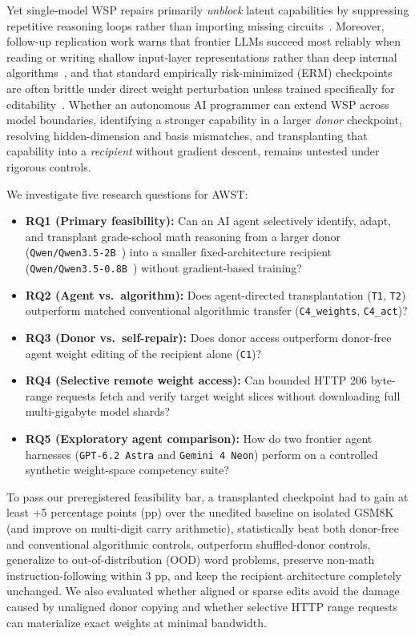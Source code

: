 \documentclass[11pt]{article}
\newcommand{\codepath}[1]{\texttt{\nolinkurl{#1}}}
\begin{document}
Yet single-model WSP repairs primarily \emph{unblock} latent capabilities by suppressing repetitive reasoning loops rather than importing missing circuits~\cite{takehi2026sparks}. Moreover, follow-up replication work warns that frontier LLMs succeed most reliably when reading or writing shallow input-layer representations rather than deep internal algorithms~\cite{goworek2026replicating}, and that standard empirically risk-minimized (ERM) checkpoints are often brittle under direct weight perturbation unless trained specifically for editability~\cite{ropinski2026editready}. Whether an autonomous AI programmer can extend WSP across model boundaries, identifying a stronger capability in a larger \emph{donor} checkpoint, resolving hidden-dimension and basis mismatches, and transplanting that capability into a \emph{recipient} without gradient descent, remains untested under rigorous controls.

We investigate five research questions for AWST:

\begin{itemize}
\item \textbf{RQ1 (Primary feasibility):} Can an AI agent selectively identify, adapt, and transplant grade-school math reasoning from a larger donor (\codepath{Qwen/Qwen3.5-2B}~\cite{qwen2026qwen35_2b}) into a smaller fixed-architecture recipient (\codepath{Qwen/Qwen3.5-0.8B}~\cite{qwen2026qwen35_08b}) without gradient-based training?
\item \textbf{RQ2 (Agent vs.\ algorithm):} Does agent-directed transplantation (\texttt{T1}, \texttt{T2}) outperform matched conventional algorithmic transfer (\texttt{C4\_weights}, \texttt{C4\_act})?
\item \textbf{RQ3 (Donor vs.\ self-repair):} Does donor access outperform donor-free agent weight editing of the recipient alone (\texttt{C1})?
\item \textbf{RQ4 (Selective remote weight access):} Can bounded HTTP 206 byte-range requests fetch and verify target weight slices without downloading full multi-gigabyte model shards?
\item \textbf{RQ5 (Exploratory agent comparison):} How do two frontier agent harnesses (\texttt{GPT-6.2 Astra} and \texttt{Gemini 4 Neon}) perform on a controlled synthetic weight-space competency suite?
\end{itemize}

To pass our preregistered feasibility bar, a transplanted checkpoint had to gain at least +5 percentage points (pp) over the unedited baseline on isolated GSM8K (and improve on multi-digit carry arithmetic), statistically beat both donor-free and conventional algorithmic controls, outperform shuffled-donor controls, generalize to out-of-distribution (OOD) word problems, preserve non-math instruction-following within 3 pp, and keep the recipient architecture completely unchanged. We also evaluated whether aligned or sparse edits avoid the damage caused by unaligned donor copying and whether selective HTTP range requests can materialize exact weights at minimal bandwidth.
\end{document}
